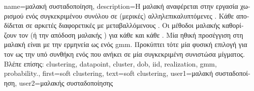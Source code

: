 {name={\foreignlanguage{greek}{μαλακή συσταδοποίηση}}, 
	description={\foreignlanguage{greek}{Η μαλακή}  
		\foreignlanguage{greek}{αναφέρεται στην εργασία χωρισμού ενός συγκεκριμένου συνόλου}  
		\foreignlanguage{greek}{σε (μερικές) αλληλεπικαλυπτόμενες} . 
		\foreignlanguage{greek}{Κάθε}  \foreignlanguage{greek}{αποδίδεται σε αρκετές διαφορετικές} 
		 \foreignlanguage{greek}{με μεταβαλλόμενους} . \foreignlanguage{greek}{Οι 
		μέθοδοι μαλακής}  \foreignlanguage{greek}{καθορίζουν τον}
		 (\foreignlanguage{greek}{ή την απόδοση μαλακής} ) \foreignlanguage{greek}{για 
		κάθε}  \foreignlanguage{greek}{και κάθε} .
		\foreignlanguage{greek}{Μία ηθική προσέγγιση στη μαλακή}  \foreignlanguage{greek}{είναι 
		με την ερμηνεία}  \foreignlanguage{greek}{ως}   
		\foreignlanguage{greek}{ενός} \gls{gmm}. \foreignlanguage{greek}{Προκύπτει τότε μία φυσική επιλογή για τον} 
		 \foreignlanguage{greek}{ως την υπό συνθήκη}  \foreignlanguage{greek}{ενός} 
		 \foreignlanguage{greek}{που ανήκει σε μία συγκεκριμένη συνιστώσα μίγματος.} \\
		\foreignlanguage{greek}{Βλέπε επίσης:} \gls{clustering}, \gls{datapoint}, \gls{cluster}, \gls{dob}, \gls{iid}, \gls{realization}, \gls{gmm}, \gls{probability}.},
	first={soft clustering},
	text={soft clustering},
	user1={\foreignlanguage{greek}{μαλακή συσταδοποίηση}}, %
	user2={\foreignlanguage{greek}{μαλακής συσταδοποίησης}} %
}

